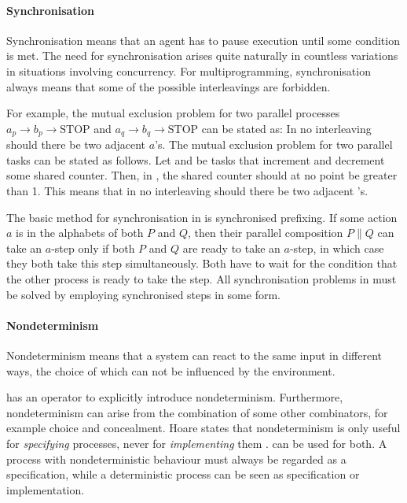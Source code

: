 \paragraph{Synchronisation}

Synchronisation means that an agent has to pause execution until some condition is met.
The need for synchronisation arises quite naturally in countless variations in situations involving concurrency.
For multiprogramming, synchronisation always means that some of the possible interleavings are forbidden.

For example, the mutual exclusion problem for two parallel processes $a_p \to b_p \to \text{STOP} $ and $a_q \to b_q \to \text{STOP}$ can be stated as:
In no interleaving should there be two adjacent $a$'s.
%
The mutual exclusion problem for two parallel tasks can be stated as follows.
Let  and  be tasks that increment and decrement some shared counter.
Then, in , the shared counter should at no point be greater than 1.
This means that in no interleaving should there be two adjacent 's.

The basic method for synchronisation in \CSP is synchronised prefixing.
If some action $a$ is in the alphabets of both $P$ and $Q$, then their parallel composition $P \parallel Q$ can take an $a$-step only if both $P$ and $Q$ are ready to take an $a$-step, in which case they both take this step simultaneously.
Both have to wait for the condition that the other process is ready to take the step.
All synchronisation problems in \CSP must be solved by employing synchronised steps in some form.



\paragraph{Nondeterminism}

Nondeterminism means that a system can react to the same input in different ways, the choice of which can not be influenced by the environment.

\CSP has an operator to explicitly introduce nondeterminism.
Furthermore, nondeterminism can arise from the combination of some other combinators, for example choice and concealment.
%
Hoare states that nondeterminism is only useful for \emph{specifying} processes, never for \emph{implementing} them \cite{books/Hoare85CSP}.
\CSP can be used for both.
A process with nondeterministic behaviour must always be regarded as a specification, while a deterministic process can be seen as specification or implementation.



